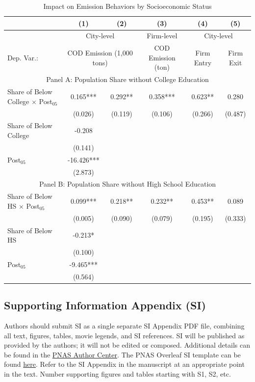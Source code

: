\documentclass[9pt,twoside]{pnas-new}
\begin{document}
\begin{table}[t!]
\centering
\caption{Impact on Emission Behaviors by Socioeconomic Status}
\begin{tabular*}{\textwidth}{@{\extracolsep{\fill}}lccccc@{}}
& (1) & (2) & (3) & (4) & (5) \\
\midrule
 & \multicolumn{2}{c}{City-level} & Firm-level & \multicolumn{2}{c}{City-level} \\
Dep. Var.: & \multicolumn{2}{c}{COD Emission (1,000 tons)} & COD Emission (ton) & Firm Entry & Firm Exit \\
\multicolumn{6}{c}{Panel A: Population Share without College Education} \\
Share of Below College $\times$ Post$_{05}$ & 0.165*** & 0.292** & 0.358*** & 0.623** & 0.280 \\
 & (0.026) & (0.119) & (0.106) & (0.266) & (0.487) \\
Share of Below College & -0.208 & & & & \\
 & (0.141) & & & & \\
Post$_{05}$ & -16.426*** & & & & \\
 & (2.873) & & & & \\
\multicolumn{6}{c}{Panel B: Population Share without High School Education} \\
Share of Below HS $\times$ Post$_{05}$ & 0.099*** & 0.218** & 0.232** & 0.453** & 0.089 \\
 & (0.005) & (0.090) & (0.079) & (0.195) & (0.333) \\
Share of Below HS & -0.213* & & & & \\
 & (0.100) & & & & \\
Post$_{05}$ & -9.465*** & & & & \\
 & (0.564) & & & & \\
\bottomrule
\end{tabular*}

\end{table}

\subsection*{Supporting Information Appendix (SI)}

Authors should submit SI as a single separate SI Appendix PDF file, combining all text, figures, tables, movie legends, and SI references. SI will be published as provided by the authors; it will not be edited or composed. Additional details can be found in the \href{https://www.pnas.org/author-center/submitting-your-manuscript#supporting-information}{PNAS Author Center}. The PNAS Overleaf SI template can be found \href{https://www.overleaf.com/latex/templates/pnas-template-for-supplementary-information/wqfsfqwyjtsd}{here}. Refer to the SI Appendix in the manuscript at an appropriate point in the text. Number supporting figures and tables starting with S1, S2, etc.
\end{document}
